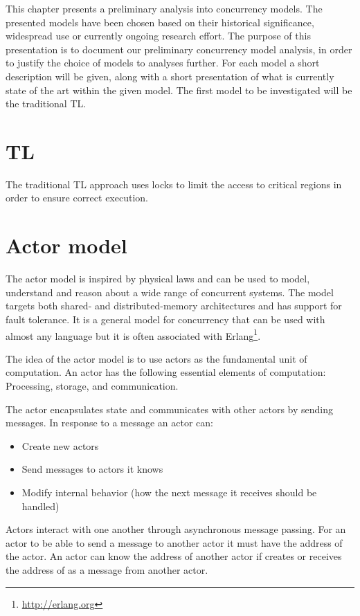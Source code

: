 \makeatletter {}\makeatother
{}
This chapter presents a preliminary analysis into concurrency models. The presented models have been chosen based on their historical significance, widespread use or currently ongoing research effort. The purpose of this presentation is to document our preliminary concurrency model analysis, in order to justify the choice of models to analyses further. For each model a short description will be given, along with a short presentation of what is currently state of the art within the given model. The first model to be investigated will be the traditional \ac{TL}.
\section{\acl{TL}}
The traditional \ac{TL} approach uses locks to limit the access to critical regions in order to ensure correct execution\cite[p. 1]{saha2006mcrt}.

\section{Actor model}
The actor model is inspired by physical laws and can be used to model, understand and reason about a wide range of concurrent systems\cite{hewitt2014actor}. The model targets both shared- and distributed-memory architectures and has support for fault tolerance\cite[Chap. 5]{sevenModels}. It is a general model for concurrency that can be used with almost any language but it is often associated with Erlang\footnote{\url{http://erlang.org}}.
 
The idea of the actor model is to use actors as the fundamental unit of computation. An actor has the following essential elements of computation\cite{actorLangNextVideo}: Processing, storage, and communication.

The actor encapsulates state and communicates with other actors by sending messages. In response to a message an actor can\cite{hewitt2014actor}:
\begin{itemize}
\item Create new actors
\item Send messages to actors it knows
\item Modify internal behavior (how the next message it receives should be handled)
\end{itemize}
Actors interact with one another through asynchronous message passing. For an actor to be able to send a message to another actor it must have the address of the actor. An actor  can know the address of another actor  if  creates  or receives the address of  as a message from another actor.

